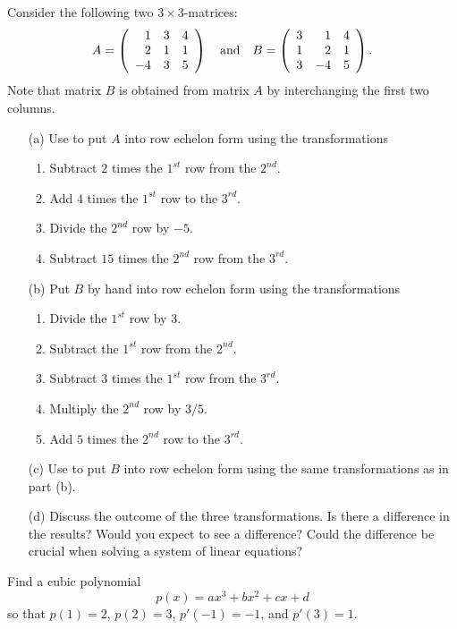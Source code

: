 \documentclass{ximera}
\begin{document}
\begin{exercise}
Consider the following two $3\times 3$-matrices:
\begin{equation*}
A=\left( \begin{array}{rrr}
     1  &  3  &  4\\
     2  &  1  &  1\\
    -4  &  3  &  5
\end{array}\right) \quad\mbox{and}\quad
B=\left( \begin{array}{rrr}
     3  &  1  &  4\\
     1  &  2  &  1\\
     3  & -4  &  5
\end{array}\right).
\end{equation*}
Note that matrix $B$ is obtained from matrix $A$ by interchanging the
first two columns.
\begin{itemize}
\item[(a)] Use \Matlab to put $A$ into row echelon form using the
transformations
\begin{enumerate}
\item Subtract $2$ times the $1^{st}$ row from the $2^{nd}$.
\item Add $4$ times the $1^{st}$ row to the $3^{rd}$.
\item Divide the $2^{nd}$ row by $-5$.
\item Subtract $15$ times the $2^{nd}$ row from the $3^{rd}$.
\end{enumerate}
\item[(b)] Put $B$ by hand into row echelon form using the
transformations
\begin{enumerate}
\item Divide the $1^{st}$ row by $3$.
\item Subtract the $1^{st}$ row from the $2^{nd}$.
\item Subtract $3$ times the $1^{st}$ row from the $3^{rd}$.
\item Multiply the $2^{nd}$ row by $3/5$.
\item Add $5$ times the $2^{nd}$ row to the $3^{rd}$.
\end{enumerate}
\item[(c)] Use \Matlab to put $B$ into row echelon form using the
same transformations as in part (b).
\item[(d)] Discuss the outcome of the three transformations.  Is
there a difference in the results?  Would you expect to see a
difference?  Could the difference be crucial when solving a system
of linear equations?
\end{itemize}
\end{exercise}

\begin{exercise} \label{c2.3.5}
Find a cubic polynomial
\[
p(x) = ax^3 + bx^2 + cx + d
\]
so that $p(1)=2$, $p(2)=3$, $p'(-1)=-1$, and $p'(3)=1$.
\end{exercise}
\end{document}
